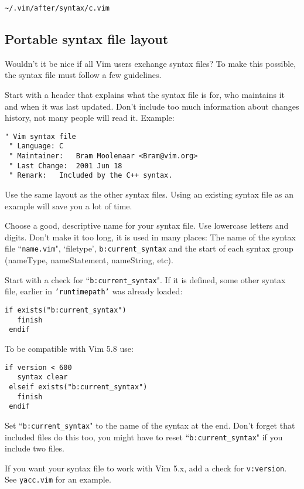 \begin{Verbatim}[samepage=true]
    ~/.vim/after/syntax/c.vim
\end{Verbatim}
\subsection{Portable syntax file layout}
Wouldn't it be nice if all Vim users exchange syntax files?  To make this possible, the syntax file must follow a few guidelines.

Start with a header that explains what the syntax file is for, who maintains it and when it was last updated.
Don't include too much information about changes history, not many people will read it.
Example:

\begin{Verbatim}[samepage=true]
 " Vim syntax file
 " Language: C
 " Maintainer:   Bram Moolenaar <Bram@vim.org>
 " Last Change:  2001 Jun 18
 " Remark:   Included by the C++ syntax.
\end{Verbatim}

Use the same layout as the other syntax files.
Using an existing syntax file as an example will save you a lot of time.

Choose a good, descriptive name for your syntax file.
Use lowercase letters and digits.
Don't make it too long, it is used in many places: The name of the syntax file ``\texttt{name.vim}", `filetype', \texttt{b:current\_syntax} and the start of each syntax group (nameType, nameStatement, nameString, etc).

Start with a check for ``\texttt{b:current\_syntax}".
If it is defined, some other syntax file, earlier in \texttt{'runtimepath'} was already loaded:

\begin{Verbatim}[samepage=true]
 if exists("b:current_syntax")
   finish
 endif
\end{Verbatim}

To be compatible with Vim 5.8 use:

\begin{Verbatim}[samepage=true]
 if version < 600
   syntax clear
 elseif exists("b:current_syntax")
   finish
 endif
\end{Verbatim}

Set ``\texttt{b:current\_syntax}" to the name of the syntax at the end.
Don't forget that included files do this too, you might have to reset ``\texttt{b:current\_syntax}" if you include two files.

If you want your syntax file to work with Vim 5.x, add a check for \texttt{v:version}.
See \texttt{yacc.vim} for an example.

